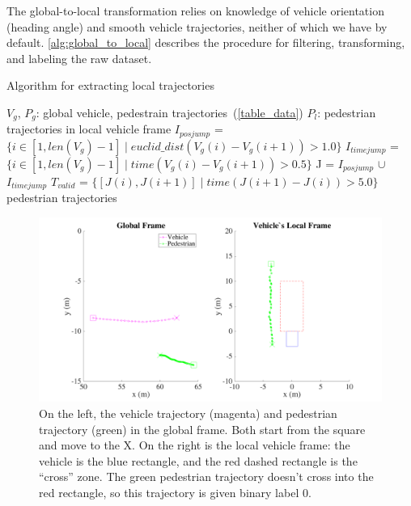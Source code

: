 The global-to-local transformation relies on knowledge of vehicle orientation (heading angle) and smooth vehicle trajectories, neither of which we have by default.
\cref{alg:global_to_local} describes the procedure for filtering, transforming, and labeling the raw dataset.

\begin{algorithm}\label{alg:global_to_local}
	\caption{Algorithm for extracting local trajectories}
	\begin{algorithmic}[1]
		\renewcommand{\algorithmicrequire}{\textbf{Input:}}
		\renewcommand{\algorithmicensure}{\textbf{Output:}}
		\REQUIRE $V_g$, $P_g$: global vehicle, pedestrain trajectories~(\cref{table_data})
		\ENSURE  $P_l$: pedestrian trajectories in local vehicle frame
			\STATE $I_{pos jump}$ = $\{i \in [1,len(V_g)-1] \mid euclid\_dist(V_g(i)-V_g(i+1))>1.0\}$
			\STATE $I_{time jump}$ = $\{i \in [1,len(V_g)-1] \mid time(V_g(i)-V_g(i+1))>0.5\}$
			\STATE J = $I_{pos jump}$ $\cup$ $I_{time jump}$
			\STATE $T_{valid}$ = $\{[J(i), J(i+1)] \mid time(J(i+1) - J(i)) > 5.0\}$
		\ENDFOR
		\RETURN pedestrian trajectories 
	\end{algorithmic} 
\end{algorithm}

\begin{figure}
	\centering
	\includegraphics [trim=0 0 0 0, clip, angle=0, width=0.8\columnwidth,
	keepaspectratio]{figures/global_to_local}
	\caption{On the left, the vehicle trajectory (magenta) and pedestrian trajectory (green) in the global frame. Both start from the square and move to the X. On the right is the local vehicle frame: the vehicle is the blue rectangle, and the red dashed rectangle is the ``cross'' zone. The green pedestrian trajectory doesn't cross into the red rectangle, so this trajectory is given binary label 0.} 
	\label{fig:global_to_local_matlab} 
\end{figure}

